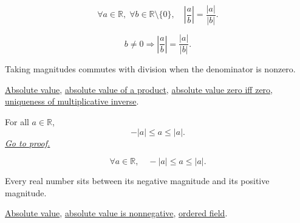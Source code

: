 \begin{remark*}
\[
  \forall a \in \mathbb{R},\;
  \forall b \in \mathbb{R} \setminus \{0\},\quad
  \left\lvert \frac{a}{b} \right\rvert
  = \frac{\lvert a \rvert}{\lvert b \rvert}.
\]
\end{remark*}

\begin{remark*}
\[
b\ne0\Rightarrow \left|\frac ab\right|=\frac{|a|}{|b|}.
\]
\end{remark*}

\begin{remark*}[Interpretation]
Taking magnitudes commutes with division when the denominator is nonzero.
\end{remark*}

\begin{dependencies}
\hyperref[def:absolute-value]{Absolute value},
\hyperref[thm:absolute-value-product]{absolute value of a product},
\hyperref[thm:absolute-value-zero-iff-zero]{absolute value zero iff zero},
\hyperref[cor:uniqueness-multiplicative-inverse-on-q]{uniqueness of
multiplicative inverse}.
\end{dependencies}


\begin{theorem}
\label{thm:absolute-value-bounds}
For all $a \in \mathbb{R}$,
\[
  -\lvert a \rvert \le a \le \lvert a \rvert.
\]
\hyperref[prf:absolute-value-bounds]{\textit{Go to proof.}}
\end{theorem}



\begin{remark*}
\[
  \forall a \in \mathbb{R},\quad
  -\lvert a \rvert \le a \le \lvert a \rvert.
\]
\end{remark*}

\begin{remark*}[Interpretation]
Every real number sits between its negative magnitude and its positive magnitude.
\end{remark*}

\begin{dependencies}
\hyperref[def:absolute-value]{Absolute value},
\hyperref[thm:absolute-value-nonneg]{absolute value is nonnegative},
\hyperref[def:real-ordered-field]{ordered field}.
\end{dependencies}

